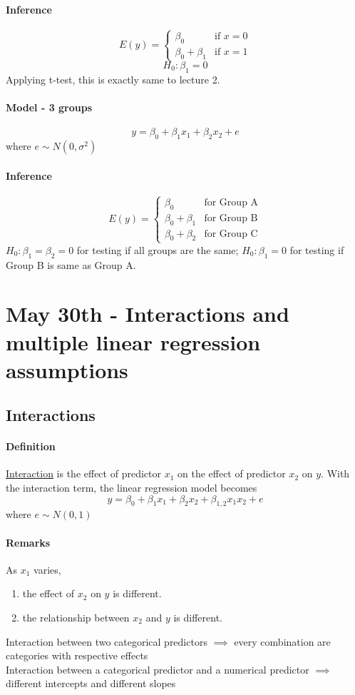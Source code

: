 \documentclass[11pt]{article}
\newcommand{\under}[1]{\underline{#1}}
\begin{document}
\paragraph{Inference}
$$E(y) = \begin{cases}
	\beta_0 & \text{if $x = 0$} \\
	\beta_0 + \beta_1 &\text{if $x = 1$}
\end{cases}$$
$$H_0: \beta_1 = 0$$
Applying t-test, this is exactly same to lecture 2.
\paragraph{Model - 3 groups}
$$y = \beta_0 + \beta_1 x_1 + \beta_2 x_2 + e$$
where $e \sim N(0, \sigma^2)$
\paragraph{Inference}
$$E(y) = \begin{cases}
	\beta_0 & \text{for Group A} \\
	\beta_0 + \beta_1 &\text{for Group B} \\
	\beta_0 + \beta_2 &\text{for Group C}
\end{cases}$$
$H_0: \beta_1 = \beta_2 = 0$ for testing if all groups are the same; $H_0: \beta_1 = 0$ for testing if Group B is same as Group A.

\section{May 30th - Interactions and multiple linear regression assumptions}
\subsection{Interactions}
\paragraph{Definition} \under{Interaction} is the effect of predictor $x_1$ on the effect of predictor $x_2$ on $y$. With the interaction term, the linear regression model becomes
$$y = \beta_0 + \beta_1x_1 + \beta_2 x_2 + \beta_{1,2}x_1x_2 + e$$
where $e \sim N(0,1)$
\paragraph{Remarks}
As $x_1$ varies, 
\begin{enumerate}
	\item the effect of $x_2$ on $y$ is different.
	\item the relationship between $x_2$ and $y$ is different.
\end{enumerate}
Interaction between two categorical predictors $\implies$ every combination are categories with respective effects\\
Interaction between a categorical predictor and a numerical predictor $\implies$ different intercepts and different slopes\\
\end{document}
